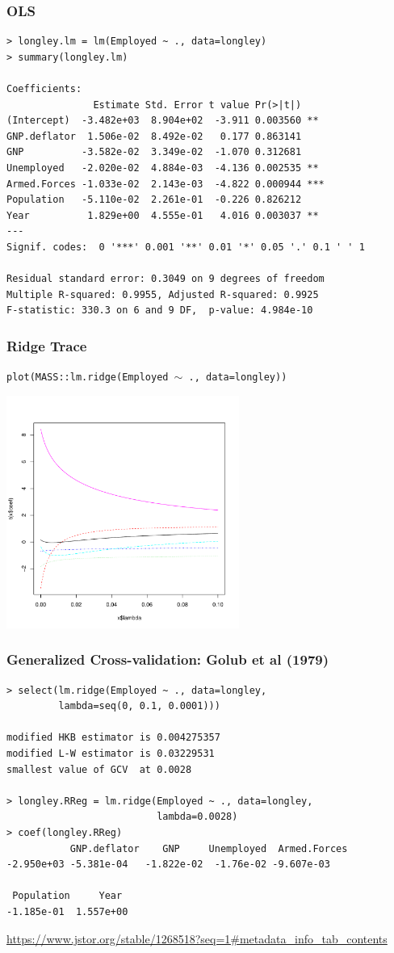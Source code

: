 \documentclass[handout]{beamer}\usepackage[]{graphicx}\usepackage[]{color}
\begin{document}
\begin{frame}[fragile]
  \frametitle{OLS}
\begin{small}
\begin{verbatim}
> longley.lm = lm(Employed ~ ., data=longley)
> summary(longley.lm)

Coefficients:
               Estimate Std. Error t value Pr(>|t|)
(Intercept)  -3.482e+03  8.904e+02  -3.911 0.003560 **
GNP.deflator  1.506e-02  8.492e-02   0.177 0.863141
GNP          -3.582e-02  3.349e-02  -1.070 0.312681
Unemployed   -2.020e-02  4.884e-03  -4.136 0.002535 **
Armed.Forces -1.033e-02  2.143e-03  -4.822 0.000944 ***
Population   -5.110e-02  2.261e-01  -0.226 0.826212
Year          1.829e+00  4.555e-01   4.016 0.003037 **
---
Signif. codes:  0 '***' 0.001 '**' 0.01 '*' 0.05 '.' 0.1 ' ' 1

Residual standard error: 0.3049 on 9 degrees of freedom
Multiple R-squared: 0.9955,	Adjusted R-squared: 0.9925
F-statistic: 330.3 on 6 and 9 DF,  p-value: 4.984e-10
\end{verbatim}
\end{small}
\end{frame}
\begin{frame}
  \frametitle{Ridge Trace}
  {\tt{plot(MASS::lm.ridge(Employed $\sim$ ., data=longley))}}
  \centerline{\includegraphics[height=3in]{ridge-trace}}
\end{frame}
\begin{frame}[fragile]
\frametitle{Generalized Cross-validation: Golub et al (1979)}

\begin{small}
\begin{verbatim}
> select(lm.ridge(Employed ~ ., data=longley,
         lambda=seq(0, 0.1, 0.0001)))

modified HKB estimator is 0.004275357
modified L-W estimator is 0.03229531
smallest value of GCV  at 0.0028

> longley.RReg = lm.ridge(Employed ~ ., data=longley,
                          lambda=0.0028)
> coef(longley.RReg)
           GNP.deflator    GNP     Unemployed  Armed.Forces
-2.950e+03 -5.381e-04   -1.822e-02  -1.76e-02 -9.607e-03

 Population     Year
-1.185e-01  1.557e+00
\end{verbatim}

\end{small}
{\url{https://www.jstor.org/stable/1268518?seq=1#metadata_info_tab_contents}}
\end{frame}
\end{document}
